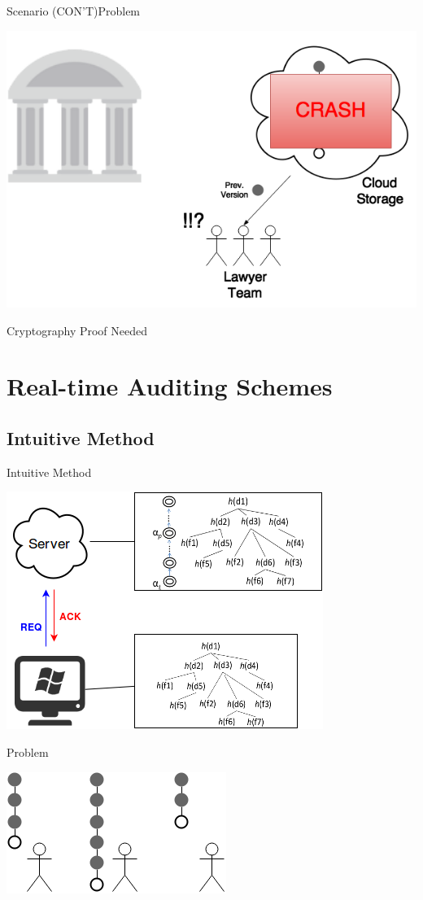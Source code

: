 \documentclass{beamer}
\begin{document}
\begin{CJK}{UTF8}{bkai}
\begin{frame}{Scenario (CON'T)}{Problem}
	\begin{center}
	\includegraphics[width=.7\textwidth]{Scenario3.png}
	\end{center}
	\alert{Cryptography Proof Needed}
\end{frame}

\section{Real-time Auditing Schemes}
\subsection{\small{Intuitive Method}}
\begin{frame}{Intuitive Method}
	\begin{center}
	\includegraphics[width=.7\textwidth]{intuitive.png}
	\end{center}
\end{frame}

\begin{frame}{Problem}
	\begin{center}
	\includegraphics[width=.5\textwidth]{Problem1.png}
	\end{center}
\end{frame}


\end{CJK}
\end{document}
